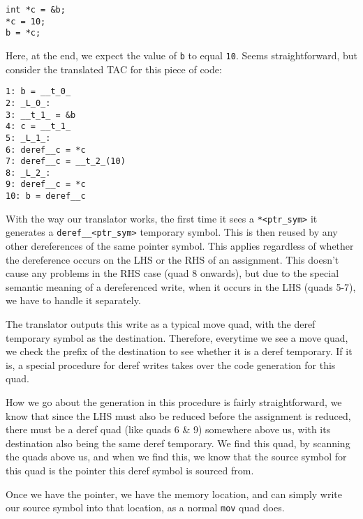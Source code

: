 \documentclass{article}
\begin{document}
{{\begin{enumerate}
\begin{verbatim}
int *c = &b;
*c = 10;
b = *c;
\end{verbatim}
			Here, at the end, we expect the value of \verb|b| to equal \verb|10|. Seems straightforward, but consider the translated TAC for this piece of code:
\begin{verbatim}
1: b = __t_0_
2: _L_0_:
3: __t_1_ = &b
4: c = __t_1_
5: _L_1_:
6: deref__c = *c
7: deref__c = __t_2_(10)
8: _L_2_:
9: deref__c = *c
10: b = deref__c
\end{verbatim}
		With the way our translator works, the first time it sees a \verb|*<ptr_sym>| it generates a \verb|deref__<ptr_sym>| temporary symbol. This is then reused by any other dereferences of the same pointer symbol. This applies regardless of whether the dereference occurs on the LHS or the RHS of an assignment. This doesn't cause any problems in the RHS case (quad 8 onwards), but due to the special semantic meaning of a dereferenced write, when it occurs in the LHS (quads 5-7), we have to handle it separately.\bigskip

		The translator outputs this write as a typical move quad, with the deref temporary symbol as the destination. Therefore, everytime we see a move quad, we check the prefix of the destination to see whether it is a deref temporary. If it is, a special procedure for deref writes takes over the code generation for this quad.\bigskip

		How we go about the generation in this procedure is fairly straightforward, we know that since the LHS must also be reduced before the assignment is reduced, there must be a deref quad (like quads 6 \& 9) somewhere above us, with its destination also being the same deref temporary. We find this quad, by scanning the quads above us, and when we find this, we know that the source symbol for this quad is the pointer this deref symbol is sourced from.\bigskip

		Once we have the pointer, we have the memory location, and can simply write our source symbol into that location, as a normal \verb|mov| quad does.
		\end{enumerate}
	}
}
\end{document}
